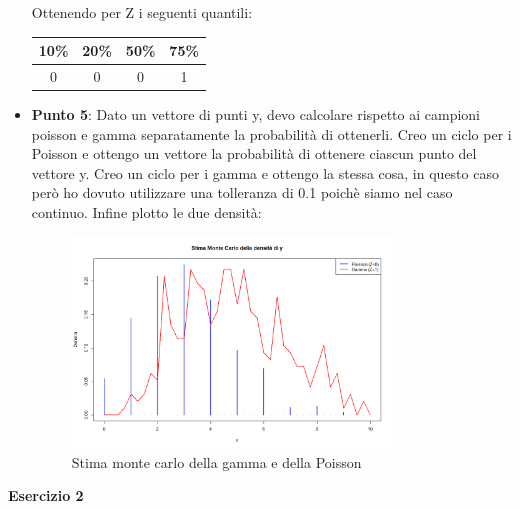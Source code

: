 \documentclass[a4paper,12pt]{article}
\begin{document}
\begin{itemize}
		Ottenendo per Z i seguenti quantili:\newline
	\begin{tabular}{|c|c|c|c|}
		\hline
		10\% & 20\% & 50\% & 75\% \\
		\hline
		0 & 0 & 0 & 1 \\
		\hline
	\end{tabular}
	\item \textbf{Punto 5}: Dato un vettore di punti y, devo calcolare rispetto ai campioni poisson e gamma separatamente la probabilità di ottenerli. Creo un ciclo per i Poisson e ottengo un vettore la probabilità di ottenere ciascun punto del vettore y. Creo un ciclo per i gamma e ottengo la stessa cosa, in questo caso però ho dovuto utilizzare una tolleranza di 0.1 poichè siamo nel caso continuo. Infine plotto le due densità:
	\begin{figure}[h] %
		\centering %
		\includegraphics[width=0.8\textwidth]{doppiadens.png} %
		\caption{Stima monte carlo della gamma e della Poisson} %
		\label{fig:immagine} %
	\end{figure}	
\end{itemize}
\newpage
\centering \textbf{Esercizio 2}\\
\end{document}
